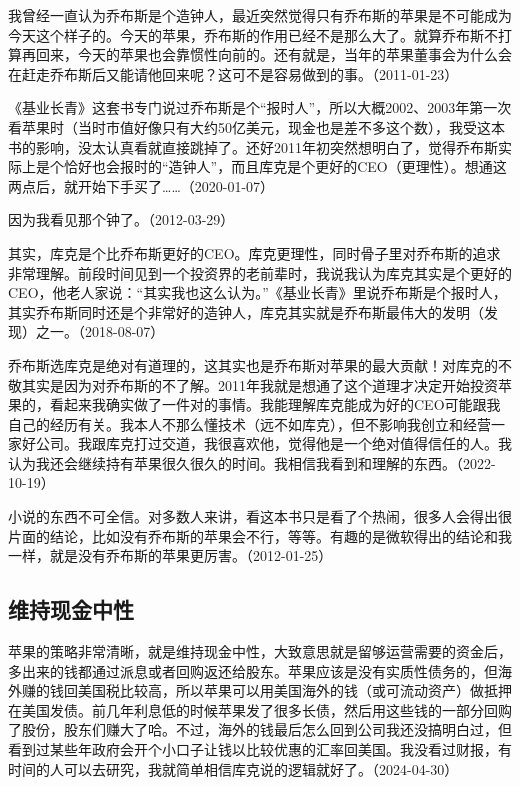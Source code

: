 我曾经一直认为乔布斯是个造钟人，最近突然觉得只有乔布斯的苹果是不可能成为今天这个样子的。今天的苹果，乔布斯的作用已经不是那么大了。就算乔布斯不打算再回来，今天的苹果也会靠惯性向前的。还有就是，当年的苹果董事会为什么会在赶走乔布斯后又能请他回来呢？这可不是容易做到的事。（2011-01-23）

《基业长青》这套书专门说过乔布斯是个“报时人”，所以大概2002、2003年第一次看苹果时（当时市值好像只有大约50亿美元，现金也是差不多这个数），我受这本书的影响，没太认真看就直接跳掉了。还好2011年初突然想明白了，觉得乔布斯实际上是个恰好也会报时的“造钟人”，而且库克是个更好的CEO（更理性）。想通这两点后，就开始下手买了……（2020-01-07）


因为我看见那个钟了。（2012-03-29）

其实，库克是个比乔布斯更好的CEO。库克更理性，同时骨子里对乔布斯的追求非常理解。前段时间见到一个投资界的老前辈时，我说我认为库克其实是个更好的CEO，他老人家说：“其实我也这么认为。”《基业长青》里说乔布斯是个报时人，其实乔布斯同时还是个非常好的造钟人，库克其实就是乔布斯最伟大的发明（发现）之一。（2018-08-07）


乔布斯选库克是绝对有道理的，这其实也是乔布斯对苹果的最大贡献！对库克的不敬其实是因为对乔布斯的不了解。2011年我就是想通了这个道理才决定开始投资苹果的，看起来我确实做了一件对的事情。我能理解库克能成为好的CEO可能跟我自己的经历有关。我本人不那么懂技术（远不如库克），但不影响我创立和经营一家好公司。我跟库克打过交道，我很喜欢他，觉得他是一个绝对值得信任的人。我认为我还会继续持有苹果很久很久的时间。我相信我看到和理解的东西。（2022-10-19）


小说的东西不可全信。对多数人来讲，看这本书只是看了个热闹，很多人会得出很片面的结论，比如没有乔布斯的苹果会不行，等等。有趣的是微软得出的结论和我一样，就是没有乔布斯的苹果更厉害。（2012-01-25）

\subsection{维持现金中性}

苹果的策略非常清晰，就是维持现金中性，大致意思就是留够运营需要的资金后，多出来的钱都通过派息或者回购返还给股东。苹果应该是没有实质性债务的，但海外赚的钱回美国税比较高，所以苹果可以用美国海外的钱（或可流动资产）做抵押在美国发债。前几年利息低的时候苹果发了很多长债，然后用这些钱的一部分回购了股份，股东们赚大了哈。不过，海外的钱最后怎么回到公司我还没搞明白过，但看到过某些年政府会开个小口子让钱以比较优惠的汇率回美国。我没看过财报，有时间的人可以去研究，我就简单相信库克说的逻辑就好了。（2024-04-30）

